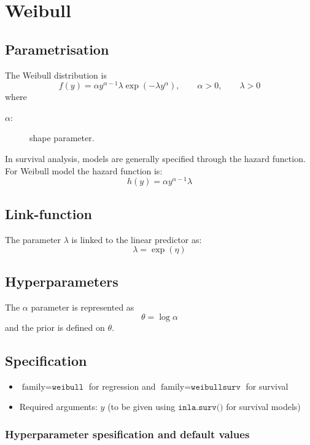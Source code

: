\documentclass[a4paper,11pt]{article}
\begin{document}
\section*{Weibull}

\subsection*{Parametrisation}

The Weibull distribution is
\begin{displaymath}
    f(y) = \alpha y^{\alpha-1}
    \lambda\exp( - \lambda  y^{\alpha}),
    \qquad \alpha>0, \qquad \lambda>0
\end{displaymath}
where
\begin{description}
\item[$\alpha$:] shape parameter.
\end{description}
In survival analysis, models are generally specified through the
hazard function. For Weibull model the hazard function is:
\begin{displaymath}
    h(y)  = \alpha y^{\alpha-1} \lambda
\end{displaymath}

\subsection*{Link-function}

The parameter $\lambda$ is linked to the linear predictor as:
\[
\lambda = \exp(\eta)
\]
\subsection*{Hyperparameters}

The $\alpha$ parameter is represented as
\[
\theta = \log\alpha
\]
and the prior is defined on $\theta$.

\subsection*{Specification}

\begin{itemize}
\item $\text{family}=\texttt{weibull}$ for regression and
 $\text{family}=\texttt{weibullsurv}$ for survival
\item Required arguments: $y$ (to be given using
    $\texttt{inla.surv()}$ for survival models)
\end{itemize}

\subsubsection*{Hyperparameter spesification and default values}
\end{document}
